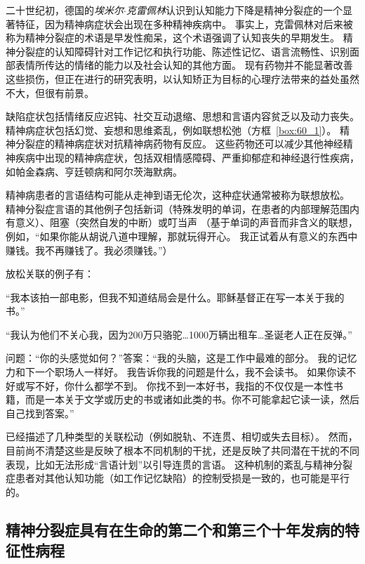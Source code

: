 二十世纪初，德国的\textit{埃米尔$\cdot$克雷佩林}认识到认知能力下降是精神分裂症的一个显著特征，因为精神病症状会出现在多种精神疾病中。
事实上，克雷佩林对后来被称为精神分裂症的术语是早发性痴呆，这个术语强调了认知丧失的早期发生。
精神分裂症的认知障碍针对工作记忆和执行功能、陈述性记忆、语言流畅性、识别面部表情所传达的情绪的能力以及社会认知的其他方面。
现有药物并不能显著改善这些损伤，但正在进行的研究表明，以认知矫正为目标的心理疗法带来的益处虽然不大，但很有前景。


缺陷症状包括情绪反应迟钝、社交互动退缩、思想和言语内容贫乏以及动力丧失。
精神病症状包括幻觉、妄想和思维紊乱，例如联想松弛（方框~\ref{box:60_1}）。
精神分裂症的精神病症状对抗精神病药物有反应。
这些药物还可以减少其他神经精神疾病中出现的精神病症状，包括双相情感障碍、严重抑郁症和神经退行性疾病，如帕金森病、亨廷顿病和阿尔茨海默病。


\begin{proposition}[思维障碍] \label{box:60_1}
	
	\quad \quad 精神病患者的言语结构可能从走神到语无伦次，这种症状通常被称为联想放松。
	精神分裂症言语的其他例子包括新词（特殊发明的单词，在患者的内部理解范围内有意义）、阻塞（突然自发的中断）或叮当声
   （基于单词的声音而非含义的联想，例如，“如果你能从胡说八道中理解，那就玩得开心。
	我正试着从有意义的东西中赚钱。我不再赚钱了。我必须赚钱。”）
	
	放松关联的例子有：
	
	“我本该拍一部电影，但我不知道结局会是什么。耶稣基督正在写一本关于我的书。”
	
	“我认为他们不关心我，因为200万只骆驼…1000万辆出租车…圣诞老人正在反弹。”
	
	问题：“你的头感觉如何？”答案：“我的头脑，这是工作中最难的部分。
	我的记忆力和下一个职场人一样好。
	我告诉你我的问题是什么，我不会读书。
	如果你读不好或写不好，你什么都学不到。
	你找不到一本好书，我指的不仅仅是一本性书籍，而是一本关于文学或历史的书或诸如此类的书。你不可能拿起它读一读，然后自己找到答案。”
	
	已经描述了几种类型的关联松动（例如脱轨、不连贯、相切或失去目标）。
	然而，目前尚不清楚这些是反映了根本不同机制的干扰，还是反映了共同潜在干扰的不同表现，比如无法形成“言语计划”以引导连贯的言语。
	这种机制的紊乱与精神分裂症患者对其他认知功能（如工作记忆缺陷）的控制受损是一致的，也可能是平行的。

\end{proposition}




\subsection{精神分裂症具有在生命的第二个和第三个十年发病的特征性病程}

